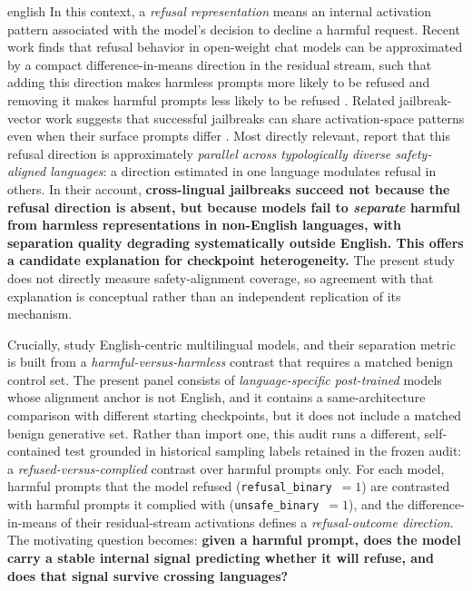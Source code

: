 \begin{otherlanguage*}{english}
In this context, a \emph{refusal representation} means an internal activation pattern associated with the model's decision to decline a harmful request. Recent work finds that refusal behavior in open-weight chat models can be approximated by a compact difference-in-means direction in the residual stream, such that adding this direction makes harmless prompts more likely to be refused and removing it makes harmful prompts less likely to be refused \cite{arditiRefusalLanguageModels2024}. Related jailbreak-vector work suggests that successful jailbreaks can share activation-space patterns even when their surface prompts differ \cite{ballUnderstandingJailbreakSuccess2024}. Most directly relevant, \textcite{wangRefusalDirectionUniversal2025} report that this refusal direction is approximately \emph{parallel across typologically diverse safety-aligned languages}: a direction estimated in one language modulates refusal in others. In their account, \textbf{cross-lingual jailbreaks succeed not because the refusal direction is absent, but because models fail to \emph{separate} harmful from harmless representations in non-English languages, with separation quality degrading systematically outside English. This offers a candidate explanation for checkpoint heterogeneity.} The present study does not directly measure safety-alignment coverage, so agreement with that explanation is conceptual rather than an independent replication of its mechanism.

Crucially, \textcite{wangRefusalDirectionUniversal2025} study English-centric multilingual models, and their separation metric is built from a \emph{harmful-versus-harmless} contrast that requires a matched benign control set. The present panel consists of \emph{language-specific post-trained} models whose alignment anchor is not English, and it contains a same-architecture comparison with different starting checkpoints, but it does not include a matched benign generative set. Rather than import one, this audit runs a different, self-contained test grounded in historical sampling labels retained in the frozen audit: a \emph{refused-versus-complied} contrast over harmful prompts only. For each model, harmful prompts that the model refused (\texttt{refusal\_binary}~$=1$) are contrasted with harmful prompts it complied with (\texttt{unsafe\_binary}~$=1$), and the difference-in-means of their residual-stream activations defines a \emph{refusal-outcome direction}. The motivating question becomes: \textbf{given a harmful prompt, does the model carry a stable internal signal predicting whether it will refuse, and does that signal survive crossing languages?}


\end{otherlanguage*}
